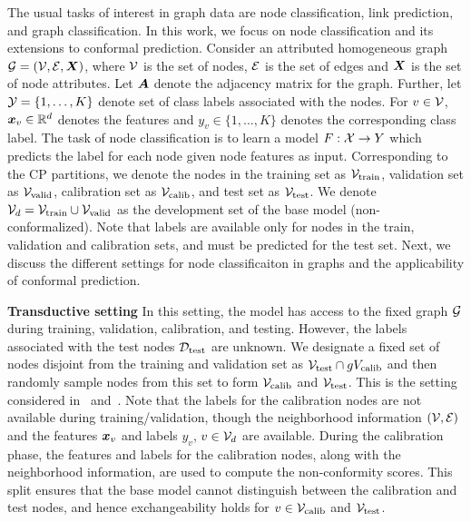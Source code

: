 The usual tasks of interest in graph data are node classification, link prediction, and graph classification. 
In this work, we focus on node classification and its extensions to conformal prediction.
Consider an attributed homogeneous graph ${\mathcal{G}} = ({\mathcal{V}}, {\mathcal{E}}, {\bm{X}})$, where ${\mathcal{V}}$ is the set of nodes, ${\mathcal{E}}$ is the set of edges and ${\bm{X}}$ is the set of node attributes.
Let ${\bm{A}}$ denote the adjacency matrix for the graph.
Further, let ${\mathcal{Y}} = \{1, \dots, K\}$ denote set of class labels associated with the nodes.
For $v \in {\mathcal{V}}$, ${\bm{x}}_v \in \mathbb{R}^d$ denotes the features and $y_v \in \{1, \dots, K\}$ denotes the corresponding class label.
The task of node classification is to learn a model $F: {\mathcal{X}} \to Y$ which predicts the label for each node given node features as input.
Corresponding to the CP partitions, we denote the nodes in the training set as ${\mathcal{V}}_{\text{train}}$, validation set as ${\mathcal{V}}_{\text{valid}}$, calibration set as ${\mathcal{V}}_{\text{calib}}$, and test set as ${\mathcal{V}}_{\text{test}}$.
We denote ${\mathcal{V}}_d = {\mathcal{V}}_{\text{train}} \cup {\mathcal{V}}_{\text{valid}}$ 
as the development set of the base model (non-conformalized). 
Note that labels are available only for nodes in the train, validation and calibration sets, and must be predicted for the test set.
Next, we discuss the different settings for node classificaiton in graphs and the applicability of conformal prediction.

\noindent \textbf{Transductive setting}
In this setting, the model has access to the fixed graph ${\mathcal{G}}$ during training, validation, calibration, and testing.
However, the labels associated with the test nodes ${\mathcal{D}}_{\text{test}}$ are unknown. 
We designate a fixed set of nodes disjoint from the training and validation set as  ${\mathcal{V}}_{\text{test}} \cap gV_{\text{calib}}$ and then randomly sample nodes from this set to form ${\mathcal{V}}_{\text{calib}}$ and ${\mathcal{V}}_{\text{test}}$.
This is the setting considered in~\citet{zargarbashi23conformal} and~\citet{huang2024uncertainty}.
Note that the labels for the calibration nodes are not available during training/validation, though the neighborhood information $({\mathcal{V}}, {\mathcal{E}})$ and the features ${\bm{x}}_v$ and labels $y_v$, $v \in {\mathcal{V}}_d$ are available.
During the calibration phase, the features and labels for the calibration nodes, along with the neighborhood information, are used to compute the non-conformity scores.
This split ensures that the base model cannot distinguish between the calibration and test nodes, and hence exchangeability holds for $v \in {\mathcal{V}}_{\text{calib}}$ and ${\mathcal{V}}_{\text{test}}$.


